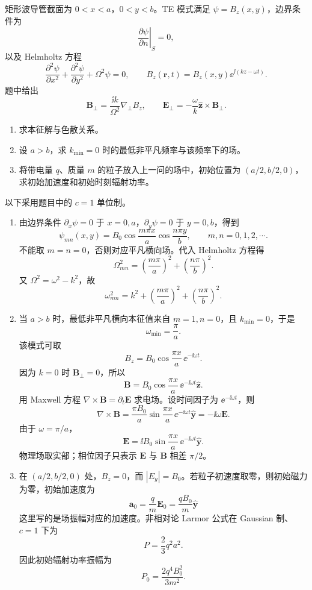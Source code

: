 \begin{question}[矩形波导管的 TE 模式]
矩形波导管截面为 $0<x<a$，$0<y<b$。TE 模式满足 $\psi=B_z(x,y)$，边界条件为
\[
  \left.\frac{\partial\psi}{\partial n}\right|_S=0,
\]
以及 Helmholtz 方程
\[
  \frac{\partial^2\psi}{\partial x^2}+\frac{\partial^2\psi}{\partial y^2}+\Omega^2\psi=0,
  \qquad
  B_z(\mathbf r,t)=B_z(x,y)\ee^{\ii(kz-\omega t)} .
\]
题中给出
\[
  \mathbf B_\perp=\frac{\ii k}{\Omega^2}\nabla_\perp B_z,
  \qquad
  \mathbf E_\perp=-\frac{\omega}{k}\hat{\mathbf z}\times\mathbf B_\perp .
\]
\begin{enumerate}
  \item 求本征解与色散关系。
  \item 设 $a>b$，求 $k_{\min}=0$ 时的最低非平凡频率与该频率下的场。
  \item 将带电量 $q$、质量 $m$ 的粒子放入上一问的场中，初始位置为 $(a/2,b/2,0)$，求初始加速度和初始时刻辐射功率。
\end{enumerate}
\begin{solution}
以下采用题目中的 $c=1$ 单位制。
\begin{enumerate}
  \item 由边界条件 $\partial_x\psi=0$ 于 $x=0,a$，$\partial_y\psi=0$ 于 $y=0,b$，得到
  \[
    \psi_{mn}(x,y)=B_0\cos\frac{m\pi x}{a}\cos\frac{n\pi y}{b},
    \qquad m,n=0,1,2,\cdots .
  \]
  不能取 $m=n=0$，否则对应平凡横向场。代入 Helmholtz 方程得
  \[
    \Omega_{mn}^2=\left(\frac{m\pi}{a}\right)^2+
    \left(\frac{n\pi}{b}\right)^2 .
  \]
  又 $\Omega^2=\omega^2-k^2$，故
  \[
    \boxed{\omega_{mn}^2=k^2+\left(\frac{m\pi}{a}\right)^2+
    \left(\frac{n\pi}{b}\right)^2} .
  \]

  \item 当 $a>b$ 时，最低非平凡横向本征值来自 $m=1,n=0$，且 $k_{\min}=0$，于是
  \[
    \boxed{\omega_{\min}=\frac{\pi}{a}} .
  \]
  该模式可取
  \[
    B_z=B_0\cos\frac{\pi x}{a}\,\ee^{-\ii\omega t} .
  \]
  因为 $k=0$ 时 $\mathbf B_\perp=0$，所以
  \[
    \mathbf B=B_0\cos\frac{\pi x}{a}\,\ee^{-\ii\omega t}\hat{\mathbf z} .
  \]
  用 Maxwell 方程 $\nabla\times\mathbf B=\partial_t\mathbf E$ 求电场。设时间因子为 $\ee^{-\ii\omega t}$，则
  \[
    \nabla\times\mathbf B=\frac{\pi B_0}{a}\sin\frac{\pi x}{a}\,\ee^{-\ii\omega t}\hat{\mathbf y}
    =-\ii\omega\mathbf E .
  \]
  由于 $\omega=\pi/a$，
  \[
    \boxed{\mathbf E=\ii B_0\sin\frac{\pi x}{a}\,\ee^{-\ii\omega t}\hat{\mathbf y}} .
  \]
  物理场取实部；相位因子只表示 $\mathbf E$ 与 $\mathbf B$ 相差 $\pi/2$。

  \item 在 $(a/2,b/2,0)$ 处，$B_z=0$，而 $|E_y|=B_0$。若粒子初速度取零，则初始磁力为零，初始加速度为
  \[
    \boxed{\mathbf a_0=\frac{q}{m}\mathbf E_0
    =\frac{qB_0}{m}\hat{\mathbf y}}
  \]
  这里写的是场振幅对应的加速度。非相对论 Larmor 公式在 Gaussian 制、$c=1$ 下为
  \[
    P=\frac23q^2a^2 .
  \]
  因此初始辐射功率振幅为
  \[
    \boxed{P_0=\frac{2q^4B_0^2}{3m^2}} .
  \]
\end{enumerate}
\end{solution}
\end{question}

